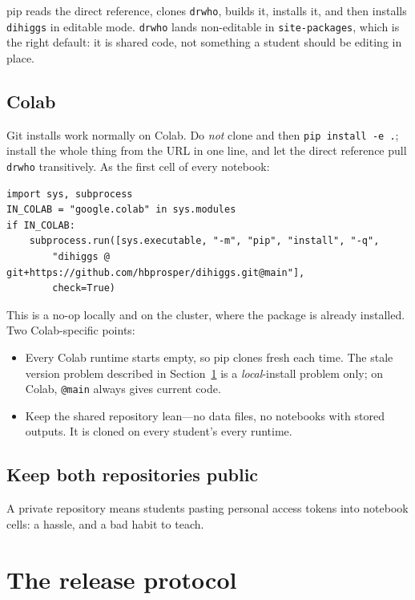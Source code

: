 \documentclass[11pt,a4paper]{article}
\newcommand{\pkg}[1]{\texttt{#1}}
\begin{document}
pip reads the direct reference, clones \pkg{drwho}, builds it, installs it, and
then installs \pkg{dihiggs} in editable mode. \pkg{drwho} lands non-editable in
\texttt{site-packages}, which is the right default: it is shared code, not
something a student should be editing in place.

\subsection{Colab}

Git installs work normally on Colab. Do \emph{not} clone and then
\texttt{pip install -e .}; install the whole thing from the URL in one line, and
let the direct reference pull \pkg{drwho} transitively. As the first cell of
every notebook:

\begin{lstlisting}[style=py]
import sys, subprocess
IN_COLAB = "google.colab" in sys.modules
if IN_COLAB:
    subprocess.run([sys.executable, "-m", "pip", "install", "-q",
        "dihiggs @ git+https://github.com/hbprosper/dihiggs.git@main"],
        check=True)
\end{lstlisting}

This is a no-op locally and on the cluster, where the package is already
installed. Two Colab-specific points:

\begin{itemize}
\item Every Colab runtime starts empty, so pip clones fresh each time. The stale
      version problem described in Section~\ref{sec:protocol} is a
      \emph{local}-install problem only; on Colab, \texttt{@main} always gives
      current code.
\item Keep the shared repository lean---no data files, no notebooks with stored
      outputs. It is cloned on every student's every runtime.
\end{itemize}

\subsection{Keep both repositories public}

A private repository means students pasting personal access tokens into notebook
cells: a hassle, and a bad habit to teach.

\section{The release protocol}\label{sec:protocol}
\end{document}
